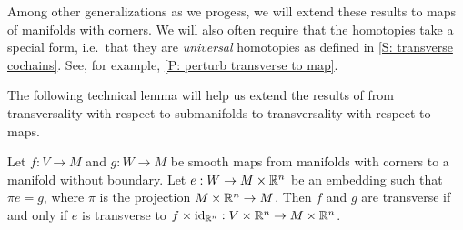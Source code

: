 Among other generalizations as we progess, we will extend these results to maps of manifolds with corners. We will also often require that the homotopies take a special form, i.e.\ that they are {\it universal} homotopies as defined in \cref{S: transverse cochains}. See, for example, \cref{P: perturb transverse to map}.

The following technical lemma will help us extend the results of \cite{GuPo74} from transversality with respect to submanifolds to transversality with respect to maps.


\begin{lemma}\label{L: all transversality is wrt embeddings}
Let $f:V\to M$ and $g:W\to M$ be smooth maps from manifolds with corners to a manifold without boundary. Let $e:W\to M\times \mathbb{R}^n$ be an embedding such that $\pi e=g$, where $\pi$ is the projection $M\times \mathbb{R}^n\to M$. Then $f$ and $g$ are transverse if and only if $e$ is transverse to $f\times\mathrm{id}_{\mathbb{R}^n}:V\times \mathbb{R}^n\to M\times \mathbb{R}^n$.
\end{lemma}

